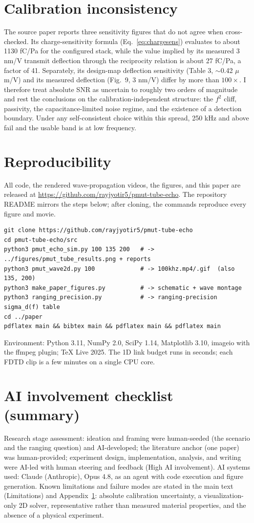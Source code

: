 \section{Calibration inconsistency}\label{app:calib}
The source paper reports three sensitivity figures that do not agree when cross-checked. Its
charge-sensitivity formula (Eq.~\eqref{eq:chargesens}) evaluates to about 1130 fC/Pa for the configured stack, while
the value implied by its measured 3 nm/V transmit deflection through the reciprocity relation is
about 27 fC/Pa, a factor of 41. Separately, its design-map deflection sensitivity (Table 3,
$\sim$0.42 $\mu$m/V) and its measured deflection (Fig.~9, 3 nm/V) differ by more than $100\times$.
I therefore treat absolute SNR as uncertain to roughly two orders of magnitude and rest the
conclusions on the calibration-independent structure: the $f^2$ cliff, passivity, the
capacitance-limited noise regime, and the existence of a detection boundary. Under any
self-consistent choice within this spread, 250 kHz and above fail and the usable band is at low
frequency.

\section{Reproducibility}\label{app:repro}
All code, the rendered wave-propagation videos, the figures, and this paper are released at
\url{https://github.com/rayjyotir5/pmut-tube-echo}. The repository README mirrors the steps
below; after cloning, the commands reproduce every figure and movie.
\begin{verbatim}
git clone https://github.com/rayjyotir5/pmut-tube-echo
cd pmut-tube-echo/src
python3 pmut_echo_sim.py 100 135 200   # -> ../figures/pmut_tube_results.png + reports
python3 pmut_wave2d.py 100             # -> 100khz.mp4/.gif  (also 135, 200)
python3 make_paper_figures.py          # -> schematic + wave montage
python3 ranging_precision.py           # -> ranging-precision sigma_d(f) table
cd ../paper
pdflatex main && bibtex main && pdflatex main && pdflatex main
\end{verbatim}
Environment: Python 3.11, NumPy 2.0, SciPy 1.14, Matplotlib 3.10, imageio with the ffmpeg
plugin; TeX Live 2025. The 1D link budget runs in seconds; each FDTD clip is a few minutes on a
single CPU core.

\section{AI involvement checklist (summary)}\label{app:checklist}
Research stage assessment: ideation and framing were human-seeded (the scenario and the ranging
question) and AI-developed; the literature anchor (one paper) was human-provided; experiment
design, implementation, analysis, and writing were AI-led with human steering and feedback (High
AI involvement). AI systems used: Claude (Anthropic), Opus 4.8, as an agent with code execution
and figure generation. Known limitations and failure modes are stated in the main text
(Limitations) and Appendix~\ref{app:calib}: absolute calibration uncertainty, a visualization-only
2D solver, representative rather than measured material properties, and the absence of a physical
experiment.
